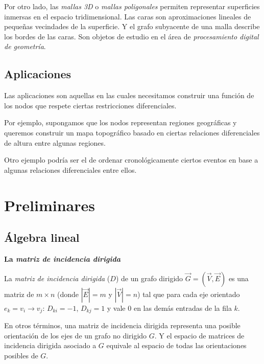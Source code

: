 \documentclass[conference,compsoc,a4paper]{IEEEtran}
\begin{document}
\bigskip

Por otro lado, las \textit{mallas 3D} o \textit{mallas poligonales} 
\cite{BKPAL:2010} permiten representar superficies inmersas en el 
espacio tridimensional. Las caras son aproximaciones lineales de 
pequeñas vecindades de la superficie. Y el grafo subyacente de una 
malla describe los bordes de las caras. Son objetos de estudio en el 
área de \textit{procesamiento digital de geometría}. 

\subsection{Aplicaciones}

Las aplicaciones son aquellas en las cuales necesitamos construir una 
función de los nodos que respete ciertas restricciones diferenciales.

Por ejemplo, supongamos que los nodos representan regiones geográficas 
y queremos construir un mapa topográfico basado en ciertas relaciones 
diferenciales de altura entre algunas regiones.

Otro ejemplo podría ser el de ordenar cronológicamente ciertos eventos 
en base a algunas relaciones diferenciales entre ellos.

\section{Preliminares}

\subsection{Álgebra lineal}

\textbf{La \textit{matriz de incidencia dirigida}}

\smallskip

La \textit{matriz de incidencia dirigida} ($D$) de un grafo dirigido 
$\vec G = (\vec V, \vec E)$ es una matriz de $m \times n$ (donde $|\vec
 E| = m$ y $|\vec V| = n$) tal que para cada eje orientado 
$e_k=v_i \rightarrow v_j$: $D_{ki} = -1$, $D_{kj} = 1$ y vale $0$ en 
las demás entradas de la fila $k$.

\smallskip

En otros términos, una matriz de incidencia dirigida representa una 
posible orientación de los ejes de un grafo no dirigido $G$. Y el 
espacio de matrices de incidencia dirigida asociado a $G$ 
equivale al espacio de todas las orientaciones posibles de $G$.

\bigskip
\end{document}
